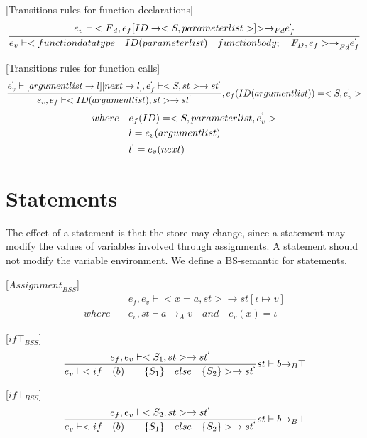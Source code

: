 [Transitions rules for function declarations]
\begin{equation}
	\frac { { e }_{ v }\vdash { <F }_{ d },{ e }_{ f }[ID\rightarrow <S,parameterlist>]{ >\rightarrow  }_{ Fd }e_{ f }^{ ` } }{ { e }_{ v }\vdash <{ functiondatatype\quad ID(parameterlist)\quad functionbody;\quad { F }_{ D },{ e }_{ f }>\rightarrow  }_{ Fd }e_{ f }^{ ` } } 
\end{equation}

[Transitions rules for function calls]
\begin{equation}
	\frac { { e }_{ v }^{ ` }\vdash [{ argumentlist\rightarrow l] }[next\rightarrow l],{ e }_{ f }^{ ` }\vdash <S,st>\rightarrow { st }^{ ` } }{ { e }_{ v },{ e }_{ f }\vdash <ID(argumentlist),st>\rightarrow { st }^{ ` } } ,{ e }_{ f }(ID(argumentlist))=<S,{ e }_{ v }^{ ` }>
\end{equation}
\begin{align*}
where\quad &{ e }_{ f }(ID)=<S,parameterlist,{ e }_{ v }^{ ` }>
\\ &l={ e }_{ v }(argumentlist)
\\ &{ l }^{ ` }={ e }_{ v }(next)
\end{align*}

\section*{Statements}
The effect of a statement is that the store may change, since a statement may modify the values of variables involved through assignments.
A statement should not modify the variable environment.
We define a BS-semantic for statements. 

[${Assignment}_{BSS}$]
\begin{align*}
	&{ e }_{ f },{ e }_{ v }\vdash <x=a,st>\rightarrow st[\iota \mapsto v]\\
	where\quad &{ e }_{ v },st\vdash a{ \rightarrow  }_{ A }v\quad and\quad  { e }_{ v }(x)=\iota 
\end{align*}

[${if\top}_{BSS}$]
\begin{equation}
	\frac { { e }_{ f },{ e }_{ v }\vdash <{ S }_{ 1 },st>\rightarrow { st }^{ ` } }{ { e }_{ v }\vdash <if\quad (b)\quad \quad \{{ S }_{ 1 }\}\quad else \quad \{{ S }_{ 2 }\}>\rightarrow { st }^{ ` } } st\vdash b{ \rightarrow  }_{ B }\top 
\end{equation}

[${if\bot}_{BSS}$]
\begin{equation}
	\frac { { e }_{ f },{ e }_{ v }\vdash <{ S }_{ 2 },st>\rightarrow { st }^{ ` } }{ { e }_{ v }\vdash <if\quad (b)\quad \quad \{{ S }_{ 1 }\}\quad else \quad \{{ S }_{ 2 }\}>\rightarrow { st }^{ ` } } st\vdash b{ \rightarrow  }_{ B }\bot 
\end{equation}

